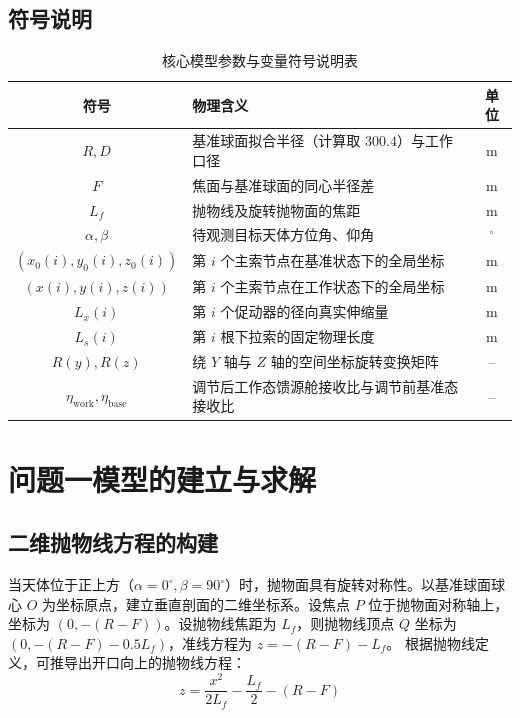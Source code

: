 \documentclass[UTF8,a4paper,zihao=-4]{ctexart}
\begin{document}
\subsection{符号说明}
\renewcommand{\arraystretch}{1.2}
\begin{table}[H]
\centering
\caption{核心模型参数与变量符号说明表}
\begin{tabular}{cp{8.5cm}c}
\toprule
符号 & 物理含义 & 单位 \\
\midrule
$R, D$ & 基准球面拟合半径（计算取 $300.4$）与工作口径 & m \\
$F$ & 焦面与基准球面的同心半径差 & m \\
$L_f$ & 抛物线及旋转抛物面的焦距 & m \\
$\alpha,\beta$ & 待观测目标天体方位角、仰角 & $^\circ$ \\
$(x_0(i), y_0(i), z_0(i))$ & 第 $i$ 个主索节点在基准状态下的全局坐标 & m \\
$(x(i), y(i), z(i))$ & 第 $i$ 个主索节点在工作状态下的全局坐标 & m \\
$L_x(i)$ & 第 $i$ 个促动器的径向真实伸缩量 & m \\
$L_s(i)$ & 第 $i$ 根下拉索的固定物理长度 & m \\
$R(y), R(z)$ & 绕 $Y$ 轴与 $Z$ 轴的空间坐标旋转变换矩阵 & -- \\
$\eta_{\mathrm{work}}, \eta_{\mathrm{base}}$ & 调节后工作态馈源舱接收比与调节前基准态接收比 & -- \\
\bottomrule
\end{tabular}
\end{table}
\renewcommand{\arraystretch}{1.0}

\section{问题一模型的建立与求解}

\subsection{二维抛物线方程的构建}
当天体位于正上方（$\alpha=0^\circ, \beta=90^\circ$）时，抛物面具有旋转对称性。以基准球面球心 $O$ 为坐标原点，建立垂直剖面的二维坐标系。设焦点 $P$ 位于抛物面对称轴上，坐标为 $(0, -(R-F))$。设抛物线焦距为 $L_f$，则抛物线顶点 $Q$ 坐标为 $(0, -(R-F)-0.5L_f)$，准线方程为 $z = -(R-F)-L_f$。
根据抛物线定义，可推导出开口向上的抛物线方程：
\begin{equation}
z = \frac{x^2}{2L_f} - \frac{L_f}{2} - (R-F)
\label{eq:para_2d}
\end{equation}
\end{document}
